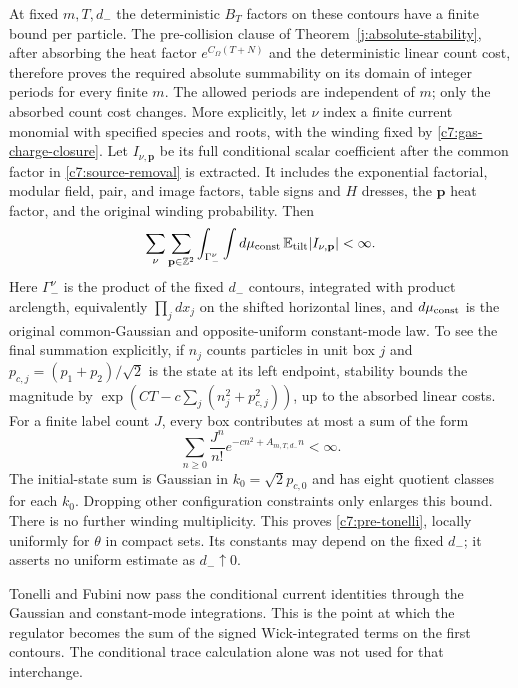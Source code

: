At fixed $m,T,d_-$ the deterministic $B_T$ factors on these contours have a
finite bound per particle.  The pre-collision clause of
Theorem~\ref{j:absolute-stability}, after absorbing the heat factor
$e^{C_\Omega(T+N)}$ and the deterministic linear count cost,
therefore proves the required absolute summability on its domain of integer
periods for every finite $m$.  The allowed periods are independent of $m$;
only the absorbed count cost changes.  More explicitly, let $\nu$ index a
finite current monomial with specified species and roots, with the winding fixed
by \eqref{c7:gas-charge-closure}.  Let $I_{\nu,\mathbf p}$ be its full
conditional scalar coefficient after the common factor in
\eqref{c7:source-removal} is extracted.  It includes the exponential
factorial, modular field, pair, and image factors, table signs and $H$
dresses, the $\mathbf p$ heat factor, and the original winding probability.
Then
\begin{equation}\label{c7:pre-tonelli}
\sum_\nu\sum_{\mathbf p\in\mathbb Z^2}
\int_{\Gamma_-^\nu}\int d\mu_{\rm const}\,
\mathbb E_{\rm tilt}|I_{\nu,\mathbf p}|<\infty.
\end{equation}
Here $\Gamma_-^\nu$ is the product of the fixed $d_-$ contours, integrated
with product arclength, equivalently $\prod_jdx_j$ on the shifted horizontal
lines, and
$d\mu_{\rm const}$ is the original common-Gaussian and opposite-uniform
constant-mode law.  To see the final summation explicitly, if $n_j$ counts
particles in unit box $j$ and $p_{c,j}=(p_1+p_2)/\sqrt2$ is the state at
its left endpoint, stability bounds the magnitude by
$\exp(CT-c\sum_j(n_j^2+p_{c,j}^2))$, up to the absorbed linear costs.
For a finite label count $J$, every box contributes at most a sum of the
form
\[
\sum_{n\ge0}\frac{J^n}{n!}e^{-cn^2+A_{m,T,d_-}n}<\infty.
\]
The initial-state sum is Gaussian in $k_0=\sqrt2p_{c,0}$ and has eight
quotient classes for each $k_0$.  Dropping other configuration constraints
only enlarges this bound.  There is no further winding multiplicity.
This proves \eqref{c7:pre-tonelli}, locally uniformly for $\theta$ in compact
sets.  Its constants may depend on the fixed $d_-$; it asserts no uniform
estimate as $d_-\uparrow0$.

Tonelli and Fubini now pass the conditional current identities through the
Gaussian and constant-mode integrations.  This is the point at which the
regulator becomes the sum of the signed Wick-integrated terms on the first
contours.  The conditional trace calculation alone was not used for that
interchange.

